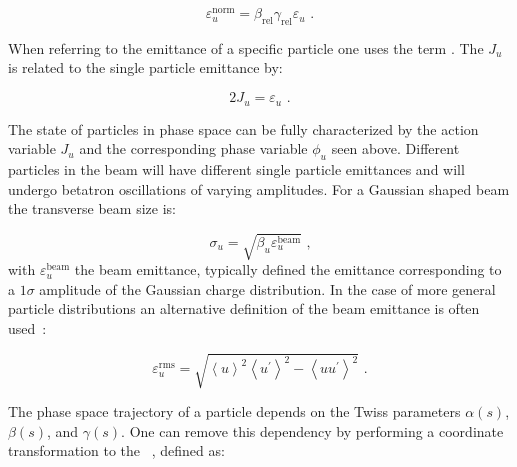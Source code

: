 \begin{equation}
    \varepsilon_u^{\mathrm{norm}} = \beta_{\mathrm{rel}} \gamma_{\mathrm{rel}} \varepsilon_u \text{ .}
    \label{equation:normalized_emittance}
\end{equation}

When referring to the emittance of a specific particle one uses the term .
The  \(J_u\) is related to the single particle emittance by:

\begin{equation}
    2 J_u = \varepsilon_u \text{ .}
    \label{equation:single_particle_action}
\end{equation}

The state of particles in phase space can be fully characterized by the action variable \(J_u\) and the corresponding phase variable \(\phi_u\) seen above. 
Different particles in the beam will have different single particle emittances and will undergo betatron oscillations of varying amplitudes.
For a Gaussian shaped beam the transverse beam size is:%

\begin{equation}
    \sigma_u = \sqrt{\beta_u \varepsilon_u^{\mathrm{beam}}} \text{ ,}
    \label{equation:gaussian_beam_transverse_beam_size}
\end{equation}
with \(\varepsilon_u^{\mathrm{beam}}\) the beam emittance, typically defined the emittance corresponding to a \(1 \sigma\) amplitude of the Gaussian charge distribution.
In the case of more general particle distributions an alternative definition of the beam emittance is often used~\cite{CERN:Muller:Beam_Matter_Covariance_Matrix_Emittance, CERN:Buon:CAS_Beam_Phase_Space_Emittance}:

\begin{equation}
    \varepsilon_u^{\mathrm{rms}} = \sqrt{\left\langle u \right\rangle^{2} \left\langle u^{\prime} \right\rangle^{2} - \left\langle uu^{\prime} \right\rangle^{2}} \text{ .}
    \label{equation:beam_emittance_general}
\end{equation}

The phase space trajectory of a particle depends on the Twiss parameters \(\alpha(s)\), \(\beta(s)\), and \(\gamma(s)\).
One can remove this dependency by performing a coordinate transformation to the ~\cite{BOOK:Bazzani:Normal_Form_Approach_Betatron_Motion}, defined as:

